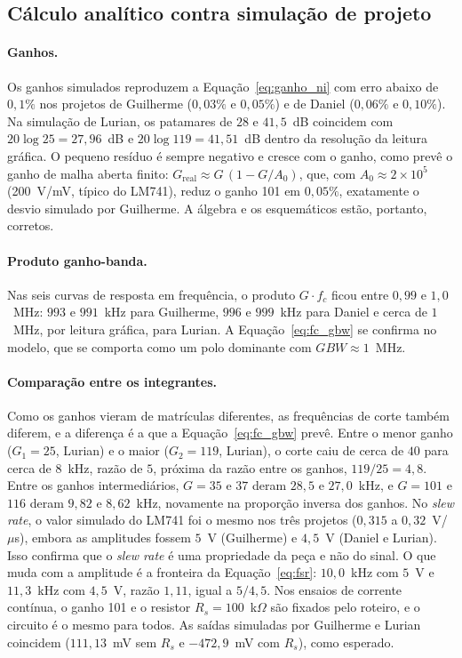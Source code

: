 \documentclass[11pt,a4paper]{article}
\begin{document}
\subsection{Cálculo analítico contra simulação de projeto}

\paragraph{Ganhos.} Os ganhos simulados reproduzem a Equação~\eqref{eq:ganho_ni} com erro abaixo
de $0{,}1\%$ nos projetos de Guilherme ($0{,}03\%$ e $0{,}05\%$) e de Daniel ($0{,}06\%$ e
$0{,}10\%$). Na simulação de Lurian, os patamares de $28$ e $41{,}5$~dB coincidem com
$20\log 25=27{,}96$~dB e $20\log 119=41{,}51$~dB dentro da resolução da leitura gráfica. O pequeno
resíduo é sempre negativo e cresce com o ganho, como prevê o ganho de malha aberta finito:
$G_{\text{real}}\approx G\,(1-G/A_0)$, que, com $A_0\approx2\times10^5$ (200~V/mV, típico do
LM741), reduz o ganho 101 em $0{,}05\%$, exatamente o desvio simulado por Guilherme. A álgebra e os
esquemáticos estão, portanto, corretos.

\paragraph{Produto ganho-banda.} Nas seis curvas de resposta em frequência, o produto $G\cdot f_c$
ficou entre $0{,}99$ e $1{,}0$~MHz: $993$ e $991$~kHz para Guilherme, $996$ e $999$~kHz para Daniel
e cerca de $1$~MHz, por leitura gráfica, para Lurian. A Equação~\eqref{eq:fc_gbw} se confirma no
modelo, que se comporta como um polo dominante com $GBW\approx1$~MHz.

\paragraph{Comparação entre os integrantes.} Como os ganhos vieram de matrículas diferentes, as
frequências de corte também diferem, e a diferença é a que a Equação~\eqref{eq:fc_gbw} prevê.
Entre o menor ganho ($G_1=25$, Lurian) e o maior ($G_2=119$, Lurian), o corte caiu de cerca de
$40$ para cerca de $8$~kHz, razão de $5$, próxima da razão entre os ganhos, $119/25=4{,}8$. Entre
os ganhos intermediários, $G=35$ e $37$ deram $28{,}5$ e $27{,}0$~kHz, e $G=101$ e $116$ deram
$9{,}82$ e $8{,}62$~kHz, novamente na proporção inversa dos ganhos. No \textit{slew rate}, o valor
simulado do LM741 foi o mesmo nos três projetos ($0{,}315$ a $0{,}32$~V/$\mu$s), embora as
amplitudes fossem $5$~V (Guilherme) e $4{,}5$~V (Daniel e Lurian). Isso confirma que o
\textit{slew rate} é uma propriedade da peça e não do sinal. O que muda com a amplitude é a
fronteira da Equação~\eqref{eq:fsr}: $10{,}0$~kHz com $5$~V e $11{,}3$~kHz com $4{,}5$~V, razão
$1{,}11$, igual a $5/4{,}5$. Nos ensaios de corrente contínua, o ganho 101 e o resistor
$R_s=100$~k$\Omega$ são fixados pelo roteiro, e o circuito é o mesmo para todos. As saídas
simuladas por Guilherme e Lurian coincidem ($111{,}13$~mV sem $R_s$ e $-472{,}9$~mV com $R_s$), como
esperado.
\end{document}
